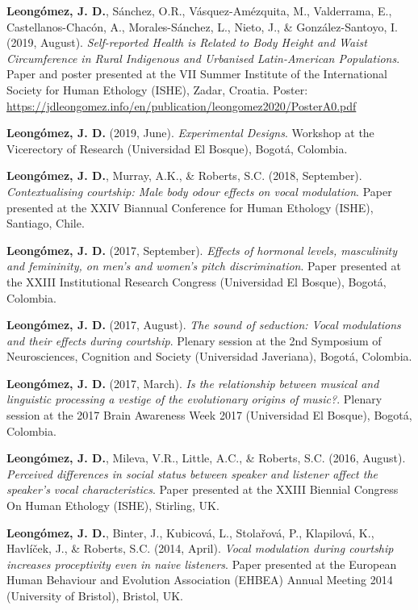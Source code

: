 \documentclass[11pt,a4paper,]{awesome-cv}
\begin{document}
\textbf{Leongómez, J. D.}, Sánchez, O.R., Vásquez-Amézquita, M.,
Valderrama, E., Castellanos-Chacón, A., Morales-Sánchez, L., Nieto, J.,
\& González-Santoyo, I. (2019, August). \emph{Self-reported Health is
Related to Body Height and Waist Circumference in Rural Indigenous and
Urbanised Latin-American Populations}. Paper and poster presented at the
VII Summer Institute of the International Society for Human Ethology
(ISHE), Zadar, Croatia. Poster:
\url{https://jdleongomez.info/en/publication/leongomez2020/PosterA0.pdf}

\textbf{Leongómez, J. D.} (2019, June). \emph{Experimental Designs}.
Workshop at the Vicerectory of Research (Universidad El Bosque), Bogotá,
Colombia.

\textbf{Leongómez, J. D.}, Murray, A.K., \& Roberts, S.C. (2018,
September). \emph{Contextualising courtship: Male body odour effects on
vocal modulation}. Paper presented at the XXIV Biannual Conference for
Human Ethology (ISHE), Santiago, Chile.

\textbf{Leongómez, J. D.} (2017, September). \emph{Effects of hormonal
levels, masculinity and femininity, on men's and women's pitch
discrimination}. Paper presented at the XXIII Institutional Research
Congress (Universidad El Bosque), Bogotá, Colombia.

\textbf{Leongómez, J. D.} (2017, August). \emph{The sound of seduction:
Vocal modulations and their effects during courtship}. Plenary session
at the 2nd Symposium of Neurosciences, Cognition and Society
(Universidad Javeriana), Bogotá, Colombia.

\textbf{Leongómez, J. D.} (2017, March). \emph{Is the relationship
between musical and linguistic processing a vestige of the evolutionary
origins of music?}. Plenary session at the 2017 Brain Awareness Week
2017 (Universidad El Bosque), Bogotá, Colombia.

\textbf{Leongómez, J. D.}, Mileva, V.R., Little, A.C., \& Roberts, S.C.
(2016, August). \emph{Perceived differences in social status between
speaker and listener affect the speaker's vocal characteristics}. Paper
presented at the XXIII Biennial Congress On Human Ethology (ISHE),
Stirling, UK.

\textbf{Leongómez, J. D.}, Binter, J., Kubicová, L., Stolařová, P.,
Klapilová, K., Havlíček, J., \& Roberts, S.C. (2014, April). \emph{Vocal
modulation during courtship increases proceptivity even in naive
listeners}. Paper presented at the European Human Behaviour and
Evolution Association (EHBEA) Annual Meeting 2014 (University of
Bristol), Bristol, UK.
\end{document}
